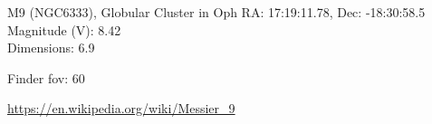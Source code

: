 \begin{block}{M9 (NGC6333), Globular Cluster in Oph}
    RA: 17:19:11.78, Dec: -18:30:58.5 \\ 
    Magnitude (V): 8.42 \\ 
    Dimensions: 6.9 

    Finder fov: 60 

    \url{https://en.wikipedia.org/wiki/Messier_9} 
\end{block}